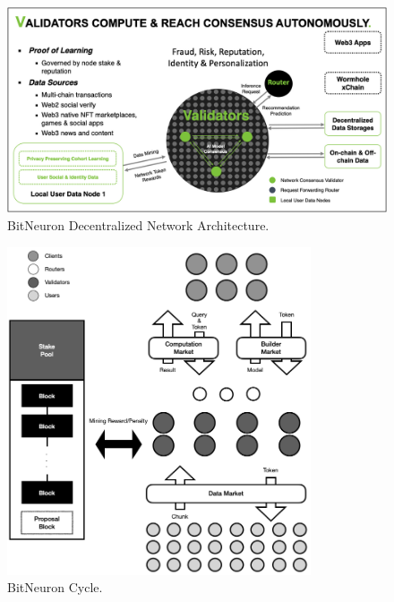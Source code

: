 \documentclass[11pt,letterpaper]{article}
\begin{document}
\begin{figure}[t]
\centering
	\includegraphics[width=6in]{fig/overall_arch.jpg}
\caption{BitNeuron Decentralized Network Architecture.} 
\label{fig:overall-arch}
\vspace{-2pt}
\end{figure}

\begin{figure}[t]
\centering
	\includegraphics[width=0.8\textwidth]{fig/tokenomics.png}
\caption{BitNeuron Cycle.} 
\label{fig:tokenomics}
\vspace{-2pt}
\end{figure}
\end{document}
